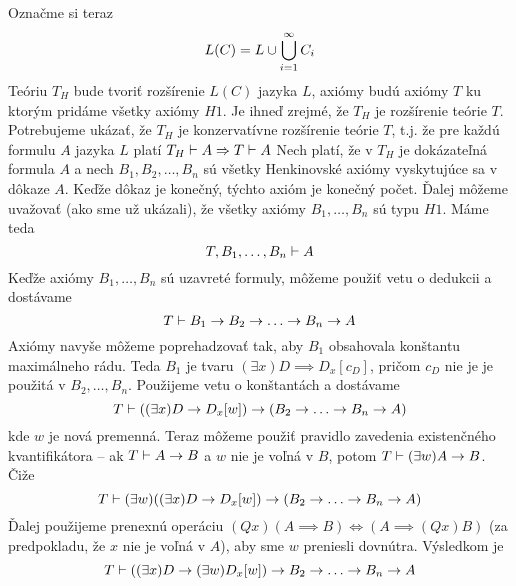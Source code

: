 \begin{dokaz}
    Označme si teraz
    \begin{equation*}
        L(C) = L \cup \bigcup_{i=1}^{\infty} C_i
    \end{equation*}
    Teóriu $T_H$ bude tvoriť rozšírenie $L(C)$ jazyka $L$,
    axiómy budú axiómy $T$ ku ktorým pridáme všetky axiómy $H1$.
    Je ihneď zrejmé, že $T_H$ je rozšírenie teórie $T$.
    Potrebujeme ukázať, že $T_H$ je konzervatívne rozšírenie teórie $T$, t.j.
    že pre každú formulu $A$ jazyka $L$ platí 
    $T_H \vdash A \Rightarrow T \vdash A$
    \startFIXME
    Nech platí, že v $T_H$ je dokázateľná formula $A$
    a nech $B_1, B_2, \ldots ,B_n$ sú všetky Henkinovské
    axiómy vyskytujúce sa v dôkaze $A$. Keďže dôkaz je konečný, týchto
    axióm je konečný počet. Ďalej môžeme uvažovať (ako sme už ukázali),
    že všetky axiómy $B_1, \ldots, B_n$ sú typu $H1$.
    Máme teda
    \begin{equation*}
        T, B_1, \dots ,B_n \vdash A
    \end{equation*}
    Keďže axiómy $B_1,\ldots,B_n$ sú uzavreté formuly, môžeme použiť vetu o dedukcii
    a dostávame
    \begin{equation*}
        T \vdash B_1 \rightarrow B_2 \rightarrow \ldots \rightarrow B_n \rightarrow A
    \end{equation*}
    Axiómy navyše môžeme poprehadzovať tak, aby $B_1$ obsahovala konštantu maximálneho rádu.
    Teda $B_1$ je tvaru $(\exists x) D \implies D_x[c_D]$, pričom $c_D$ nie je je použitá
    v $B_2, \ldots, B_n$. Použijeme vetu o konštantách a dostávame
    \begin{equation*}
        T \vdash ((\exists x) D \rightarrow D_x[w] ) \rightarrow (B_2 \rightarrow \ldots \rightarrow B_n \rightarrow A)
    \end{equation*}
    kde $w$ je nová premenná.
    Teraz môžeme použiť pravidlo zavedenia existenčného kvantifikátora --
    ak $T \vdash A \rightarrow B$ a $w$ nie je voľná v $B$, potom $T\vdash (\exists w) A \rightarrow B$.
    Čiže
    \begin{equation*}
        T \vdash (\exists w) ((\exists x)D \rightarrow D_x[w]) \rightarrow (B_2 \rightarrow
            \ldots \rightarrow B_n \rightarrow A)
    \end{equation*}
    Ďalej použijeme prenexnú operáciu $(Qx) (A\implies B) \iff (A\implies
    (Qx)B)$ (za predpokladu, že $x$ nie je voľná v $A$), aby sme $w$
    preniesli dovnútra. Výsledkom je
    \begin{equation*}
        T \provable ((\exists x) D \implies (\exists w)D_x[w]) \implies B_2 \implies \ldots \implies B_n \implies A

\end{equation*}
\end{dokaz}
